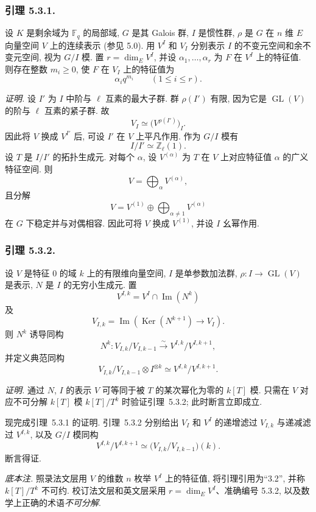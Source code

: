 \subsubsection*{引理 5.3.1.}
设 $K$ 是剩余域为 $\mathbb F_q$ 的局部域, $G$ 是其 Galois 群, $I$ 是惯性群,
$\rho$ 是 $G$ 在 $n$ 维 $E$ 向量空间 $V$ 上的连续表示 (参见 5.0).
用 $V^I$ 和 $V_I$ 分别表示 $I$ 的不变元空间和余不变元空间, 视为 $G/I$ 模.
置 $r=\dim_E V^I$, 并设 $\alpha_1,\ldots,\alpha_r$ 为 $F$ 在 $V^I$ 上的特征值.
则存在整数 $m_i\geq0$, 使 $F$ 在 $V_I$ 上的特征值为
\[
\alpha_iq^{m_i}\qquad(1\leq i\leq r).
\]

\medskip
\noindent\emph{证明.}
设 $I'$ 为 $I$ 中阶与 $\ell$ 互素的最大子群. 群 $\rho(I')$ 有限,
因为它是 $\operatorname{GL}(V)$ 的阶与 $\ell$ 互素的紧子群. 故
\[
V_I\simeq\bigl(V^{\rho(I')}\bigr)_I.
\]
因此将 $V$ 换成 $V^{I'}$ 后, 可设 $I'$ 在 $V$ 上平凡作用. 作为 $G/I$ 模有
\[
I/I'\simeq\mathbb Z_\ell(1).
\]
设 $T$ 是 $I/I'$ 的拓扑生成元. 对每个 $\alpha$, 设 $V^{(\alpha)}$
为 $T$ 在 $V$ 上对应特征值 $\alpha$ 的广义特征空间. 则
\[
V=\bigoplus_\alpha V^{(\alpha)},
\]
且分解
\[
V=V^{(1)}\oplus\bigoplus_{\alpha\ne1}V^{(\alpha)}
\]
在 $G$ 下稳定并与对偶相容. 因此可将 $V$ 换成 $V^{(1)}$, 并设 $I$ 幺幂作用.

\subsubsection*{引理 5.3.2.}
设 $V$ 是特征 $0$ 的域 $k$ 上的有限维向量空间, $I$ 是单参数加法群,
$\rho:I\longrightarrow\operatorname{GL}(V)$ 是表示, $N$ 是 $I$ 的无穷小生成元. 置
\[
V^{I,k}=V^I\cap\operatorname{Im}(N^k)
\]
及
\[
V_{I,k}=\operatorname{Im}\!\left(\operatorname{Ker}(N^{k+1})
\longrightarrow V_I\right).
\]
则 $N^k$ 诱导同构
\[
N^k:V_{I,k}/V_{I,k-1}\xrightarrow{\sim}
V^{I,k}/V^{I,k+1},
\]
并定义典范同构
\[
V_{I,k}/V_{I,k-1}\otimes I^{\otimes k}
\simeq V^{I,k}/V^{I,k+1}.
\]

\medskip
\noindent\emph{证明.}
通过 $N$, $I$ 的表示 $V$ 可等同于被 $T$ 的某次幂化为零的 $k[T]$ 模.
只需在 $V$ 对应不可分解 $k[T]$ 模 $k[T]/T^k$ 时验证引理~5.3.2;
此时断言立即成立.

现完成引理~5.3.1 的证明. 引理~5.3.2 分别给出 $V_I$ 和 $V^I$ 的递增滤过 $V_{I,k}$
与递减滤过 $V^{I,k}$, 以及 $G/I$ 模同构
\[
V^{I,k}/V^{I,k+1}\simeq
\bigl(V_{I,k}/V_{I,k-1}\bigr)(k).
\]
断言得证.

\medskip
\noindent\emph{底本注.}
照录法文层用 $V$ 的维数 $n$ 枚举 $V^I$ 上的特征值, 将引理引用为“3.2”,
并称 $k[T]/T^k$ 不可约. 校订法文层和英文层采用 $r=\dim_E V^I$、准确编号 5.3.2,
以及数学上正确的术语\emph{不可分解}.
